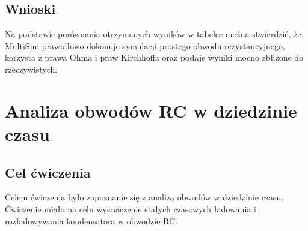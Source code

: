 \documentclass[11pt]{article}
\begin{document}
\subsection{Wnioski}
Na podstawie porównania otrzymanych wyników w tabelce można stwierdzić, że MultiSim prawidłowo dokonuje symulacji prostego obwodu rezystancyjnego, korzysta z prawa Ohma i praw Kirchhoffa oraz podaje wyniki mocno zbliżone do rzeczywistych.
\section{Analiza obwodów RC w dziedzinie czasu}
\subsection{Cel ćwiczenia}
Celem ćwiczenia było zapoznanie się z analizą obwodów w dziedzinie czasu. Ćwiczenie miało na celu wyznaczenie stałych czasowych ładowania i rozładowywania kondensatora w obwodzie RC. \newline \newline
\end{document}

